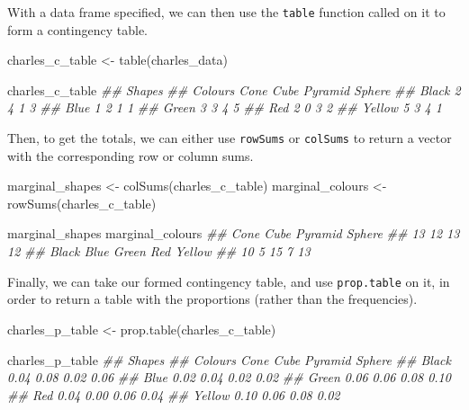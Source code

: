 \documentclass[
  letterpaper,
  DIV=11,
  numbers=noendperiod]{scrreprt}
\newenvironment{Shaded}{\begin{snugshade}}{\end{snugshade}}
\newcommand{\DocumentationTok}[1]{\textcolor[rgb]{0.37,0.37,0.37}{\textit{#1}}}
\newcommand{\FunctionTok}[1]{\textcolor[rgb]{0.28,0.35,0.67}{#1}}
\newcommand{\NormalTok}[1]{\textcolor[rgb]{0.00,0.23,0.31}{#1}}
\newcommand{\OtherTok}[1]{\textcolor[rgb]{0.00,0.23,0.31}{#1}}
\theoremstyle{definition}
\theoremstyle{definition}
\theoremstyle{definition}
\theoremstyle{remark}
\begin{document}
With a data frame specified, we can then use the \texttt{table} function
called on it to form a contingency table.

\begin{Shaded}
\begin{Highlighting}[]
\NormalTok{charles\_c\_table }\OtherTok{\textless{}{-}} \FunctionTok{table}\NormalTok{(charles\_data)}

\NormalTok{charles\_c\_table}
\DocumentationTok{\#\#         Shapes}
\DocumentationTok{\#\# Colours  Cone Cube Pyramid Sphere}
\DocumentationTok{\#\#   Black     2    4       1      3}
\DocumentationTok{\#\#   Blue      1    2       1      1}
\DocumentationTok{\#\#   Green     3    3       4      5}
\DocumentationTok{\#\#   Red       2    0       3      2}
\DocumentationTok{\#\#   Yellow    5    3       4      1}
\end{Highlighting}
\end{Shaded}

Then, to get the totals, we can either use \texttt{rowSums} or
\texttt{colSums} to return a vector with the corresponding row or column
sums.

\begin{Shaded}
\begin{Highlighting}[]
\NormalTok{marginal\_shapes }\OtherTok{\textless{}{-}} \FunctionTok{colSums}\NormalTok{(charles\_c\_table)}
\NormalTok{marginal\_colours }\OtherTok{\textless{}{-}} \FunctionTok{rowSums}\NormalTok{(charles\_c\_table)}

\NormalTok{marginal\_shapes}
\NormalTok{marginal\_colours}
\DocumentationTok{\#\#    Cone    Cube Pyramid  Sphere }
\DocumentationTok{\#\#      13      12      13      12 }
\DocumentationTok{\#\#  Black   Blue  Green    Red Yellow }
\DocumentationTok{\#\#     10      5     15      7     13}
\end{Highlighting}
\end{Shaded}

Finally, we can take our formed contingency table, and use
\texttt{prop.table} on it, in order to return a table with the
proportions (rather than the frequencies).

\begin{Shaded}
\begin{Highlighting}[]
\NormalTok{charles\_p\_table }\OtherTok{\textless{}{-}} \FunctionTok{prop.table}\NormalTok{(charles\_c\_table)}

\NormalTok{charles\_p\_table}
\DocumentationTok{\#\#         Shapes}
\DocumentationTok{\#\# Colours  Cone Cube Pyramid Sphere}
\DocumentationTok{\#\#   Black  0.04 0.08    0.02   0.06}
\DocumentationTok{\#\#   Blue   0.02 0.04    0.02   0.02}
\DocumentationTok{\#\#   Green  0.06 0.06    0.08   0.10}
\DocumentationTok{\#\#   Red    0.04 0.00    0.06   0.04}
\DocumentationTok{\#\#   Yellow 0.10 0.06    0.08   0.02}
\end{Highlighting}
\end{Shaded}
\end{document}
